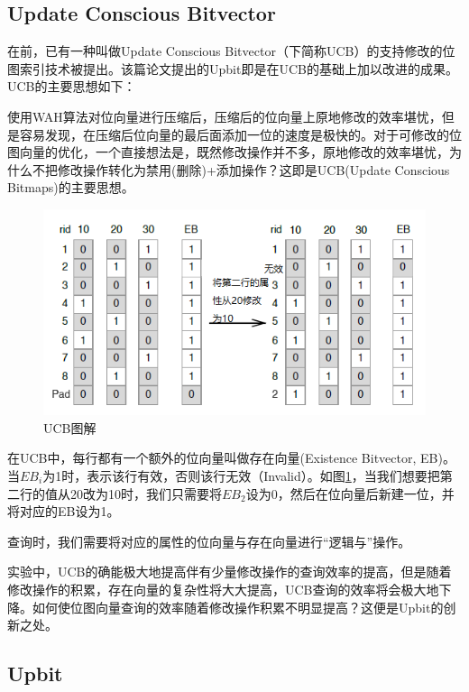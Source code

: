 \documentclass[11pt, a4paper]{article}
\begin{document}
  \subsection{Update Conscious Bitvector}

  在\cite{art1}前，已有一种叫做Update Conscious Bitvector（下简称UCB）的支持修改的位图索引技术被提出。该篇论文提出的Upbit即是在UCB的基础上加以改进的成果。UCB的主要思想如下：


  使用WAH\cite{art5}算法对位向量进行压缩后，压缩后的位向量上原地修改的效率堪忧，但是容易发现，在压缩后位向量的最后面添加一位的速度是极快的。对于可修改的位图向量的优化，一个直接想法是，既然修改操作并不多，原地修改的效率堪忧，为什么不把修改操作转化为禁用(删除)+添加操作？这即是UCB(Update Conscious Bitmaps)的主要思想。

  \begin{figure}[H]
    \begin{center}
      \includegraphics[width=5in]{img/ucb.png}
      \caption{UCB图解} \label{fig:ucb}
    \end{center}
  \end{figure}

  在UCB中，每行都有一个额外的位向量叫做存在向量(Existence Bitvector, EB)。当$EB_i$为1时，表示该行有效，否则该行无效（Invalid）。如图\ref{fig:ucb}，当我们想要把第二行的值从20改为10时，我们只需要将$EB_2$设为0，然后在位向量后新建一位，并将对应的EB设为1。

  查询时，我们需要将对应的属性的位向量与存在向量进行“逻辑与”操作。

  实验中，UCB的确能极大地提高伴有少量修改操作的查询效率的提高，但是随着修改操作的积累，存在向量的复杂性将大大提高，UCB查询的效率将会极大地下降。如何使位图向量查询的效率随着修改操作积累不明显提高？这便是Upbit的创新之处。

  \subsection{Upbit}
\end{document}
